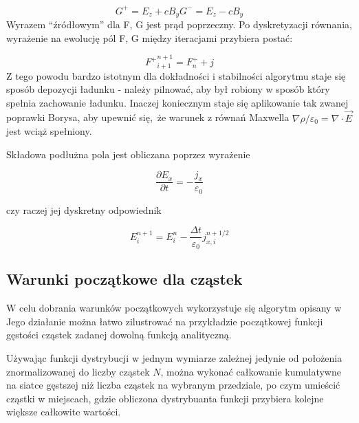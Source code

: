     \begin{equation}
        G^{+} = E_z + c B_y
        G^{-} = E_z - c B_y
        \label{eqn:Birdsall-electromagnetic-quantities-alternate-axes}
    \end{equation}
    Wyrazem ``źródłowym'' dla F, G jest prąd poprzeczny. Po dyskretyzacji
    równania, wyrażenie na ewolucję pól F, G między iteracjami przybiera
    postać:

    \begin{equation}
        {F^{+}}^{n+1}_{i+1} = F^{+}_{n} + j
    \end{equation}
    Z tego powodu bardzo istotnym dla dokładności i stabilności algorytmu staje
    się sposób depozycji ładunku - należy pilnować, aby był robiony w sposób
    który spełnia zachowanie ładunku. Inaczej koniecznym staje się aplikowanie
    tak zwanej poprawki Borysa, 
    aby upewnić się, że warunek z równań Maxwella $\nabla \rho / \varepsilon_0
    = \nabla \cdot \vec{E}$ jest wciąż spełniony.

    Składowa podłużna pola jest obliczana poprzez wyrażenie

    \begin{equation}
    \frac{\partial E_x}{\partial t} = - \frac{j_x}{\varepsilon_0}
    \label{longitudinal-field-differential}
    \end{equation}

    czy raczej jej dyskretny odpowiednik

    \begin{equation}
        E_i^{n+1} = E_i^n - \frac{\Delta t}{\varepsilon_0} j_{x,i}^{n+1/2}
    \label{longitudinal-field-finite-differential}
    \end{equation}


    \subsection{Warunki początkowe dla cząstek}

    W celu dobrania warunków początkowych wykorzystuje się algorytm opisany w
     Jego działanie można łatwo zilustrować na
    przykładzie początkowej funkcji gęstości cząstek zadanej dowolną funkcją
    analityczną. 

    Używając funkcji dystrybucji w jednym wymiarze zależnej jedynie od
    położenia znormalizowanej do liczby cząstek $N$, można wykonać całkowanie
    kumulatywne na siatce gęstszej niż liczba cząstek na wybranym przedziale,
    po czym umieścić cząstki w miejscach, gdzie obliczona dystrybuanta funkcji
     przybiera kolejne większe całkowite wartości.

